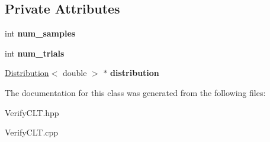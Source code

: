 \subsection*{Private Attributes}
\begin{DoxyCompactItemize}
\item 
\mbox{\label{class_verify_c_l_t_ac8a8074a0611cdafba6d6ca5d0a03c1d}} 
int {\bfseries num\+\_\+samples}
\item 
\mbox{\label{class_verify_c_l_t_ad1f356e44fb1043662c49851dd1af325}} 
int {\bfseries num\+\_\+trials}
\item 
\mbox{\label{class_verify_c_l_t_a25804188d54b373ba842b94778a2bf3e}} 
\hyperlink{class_distribution}{Distribution}$<$ double $>$ $\ast$ {\bfseries distribution}
\end{DoxyCompactItemize}


The documentation for this class was generated from the following files\+:\begin{DoxyCompactItemize}
\item 
Verify\+C\+L\+T.\+hpp\item 
Verify\+C\+L\+T.\+cpp\end{DoxyCompactItemize}
